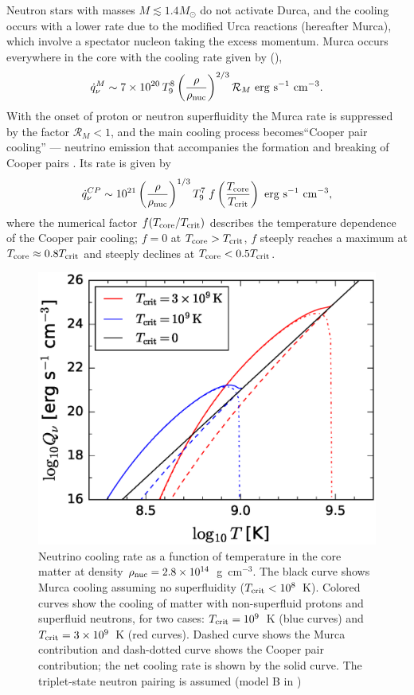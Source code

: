 Neutron stars with masses $M\lesssim 1.4M_\odot$ do not activate Durca, and the cooling occurs with a lower rate due to the modified Urca reactions (hereafter Murca), which involve a spectator nucleon taking the excess momentum.
Murca occurs everywhere in the core with the cooling rate given by 
(\citealp{1979ApJ...232..541F}),
%
\begin{equation}
	\label{eq:Murca}
  \dot{q}_{\nu}^M\sim  7\times 10^{20}
  \,T_9^8 \left(\frac{\rho}{\rho_{\rm nuc}}\right)^{2/3} \mathcal{R}_M
    {\rm ~erg~s}^{-1}{\rm ~cm}^{-3}.
\end{equation}
%
With the onset of proton or neutron superfluidity the Murca rate is suppressed by the 
factor $\mathcal{R}_M<1$, and the main cooling process becomes``Cooper pair cooling'' ---  
neutrino emission that accompanies the formation and breaking of Cooper 
pairs \citep{1976ApJ...205..541F,2009ApJ...707.1131P}. Its rate is given by
%
\begin{equation}
   \dot{q}_\nu^{CP}\sim 10^{21} \left(\frac{\rho}{\rho_{\rm nuc}}\right)^{1/3} T_9^7 
    \; f\left(\frac{T_{\rm core}}{T_{\rm crit}}\right) {\rm ~erg~s}^{-1}{\rm ~cm}^{-3}, 
\end{equation}
%
where the numerical factor $f(T_{\rm core}/T_{\rm crit})$ describes the temperature dependence of the Cooper pair cooling; $f=0$ at $T_{\rm core}>T_{\rm crit}$, $f$ steeply reaches a maximum at $T_{\rm core}\approx 0.8 T_{\rm crit}$ and steeply declines at $T_{\rm core}<0.5 T_{\rm crit}$.
%
\begin{figure}[h]
  \centering
  \includegraphics[height=0.6\textwidth]{pics/intro/qv.eps}
  \caption[Neutrino cooling rate in the core of neutron stars] {Neutrino cooling rate as a function of temperature in the core matter at density $\rho_{\rm nuc}=2.8\times 10^{14}$~g~cm$^{-3}$. The black curve shows Murca cooling assuming no superfluidity ($T_{\rm crit}<10^8$~K). Colored curves show the cooling of matter with non-superfluid protons and superfluid neutrons, for two cases: $T_{\rm crit}=10^9$~K (blue curves) and $T_{\rm crit}=3\times 10^9$~K (red curves). Dashed curve shows the Murca contribution and dash-dotted curve shows the Cooper pair contribution; the net cooling rate is shown by the solid curve.
The triplet-state neutron pairing is assumed (model B in \citealp{2001PhR...354....1Y})}
  \label{fig:NS-qv}
\end{figure}
%


